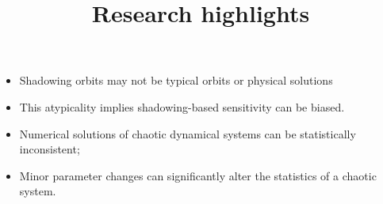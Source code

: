 \documentclass[12pt]{article}
\title{Research highlights}
\begin{document}
\maketitle
\begin{itemize}
\item Shadowing orbits may not be typical orbits or physical solutions
\item This atypicality implies shadowing-based sensitivity can be biased.
\item Numerical solutions of chaotic dynamical systems can be statistically inconsistent;
\item Minor parameter changes can significantly alter the statistics of a chaotic system.


\end{itemize}
\end{document}
